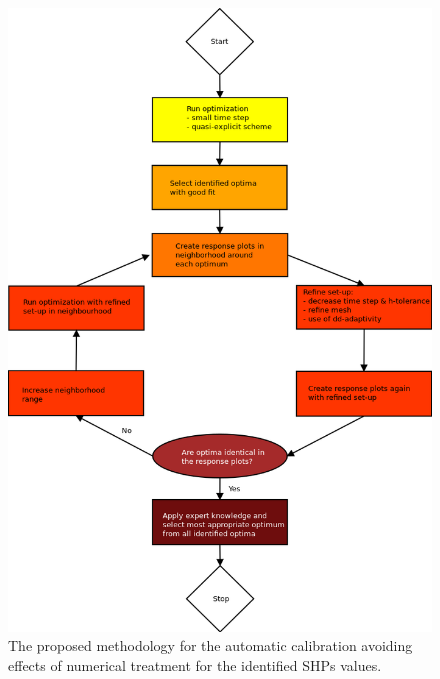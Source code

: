 \documentclass[review,times,3p,twocolumn,10pt]{elsarticle}
\begin{document}
\begin{figure}
\centering
\includegraphics[width=12cm]{flowchart/Flow_chart_barvy_new.png}
\caption{The proposed methodology for the automatic calibration avoiding effects of numerical treatment for the identified SHPs values.}
\label{flowchart}
\end{figure}
\end{document}
